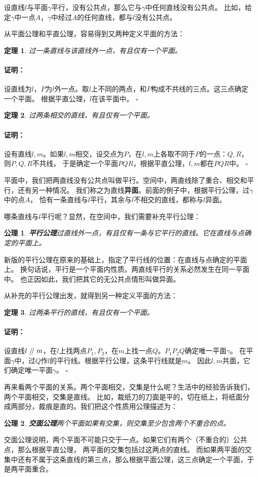 \documentclass[12pt,UTF8]{ctexbook}
\newtheorem{tm}{定理}[section]
\newtheorem{po}{公理}
\renewcommand\parallel{\mathrel{/\mskip-4mu/}}
\newenvironment{proof2}{\paragraph{\textbf{证明：}}}{\hfill$\square$}
\begin{document}
设直线$l$与平面$\gamma$平行，没有公共点，那么它与$\gamma$中任何直线没有公共点。
比如，给定$\gamma$中一点$A$，$\gamma$中经过$A$的任何直线，都与$l$没有公共点。

从平面公理和平直公理，容易得到又两种定义平面的方法：
\begin{tm}
    过一条直线与该直线外一点，有且仅有一个平面。
\end{tm}
\begin{proof2}
    设直线为$l$，$P$为$l$外一点。取$l$上不同的两点，和$P$构成不共线的三点。这三点确定一个平面。
    根据平直公理，$l$在该平面中。
\end{proof2}
\begin{tm}
    过两条相交的直线，有且仅有一个平面。
\end{tm}
\begin{proof2}
    设有直线$l,m$。如果$l,m$相交，设交点为$P$，在$l,m$上各取不同于$P$的一点：$Q,R$，则$P,Q,R$不共线，
    于是确定一个平面$PQR$，根据平直公理，$l,m$都在$PQR$中。
\end{proof2}

平面中，我们把两直线没有公共点叫做平行。空间中，两直线除了重合、相交和平行，还有另一种情况。
我们称之为直线\textbf{异面}。前面的例子中，根据平行公理，过$\gamma$中的点$A$，
恰有一条直线与$l$平行，其余与$l$不相交的直线，都称与$l$异面。

哪条直线与$l$平行呢？显然，在空间中，我们需要补充平行公理：
\begin{po}{\textbf{平行公理}}\label{po:2}
    过直线外一点，有且仅有一条与它平行的直线。它在直线与点确定的平面上。
\end{po}
新版的平行公理在原来的基础上，指定了平行线的位置：在直线与点确定的平面上。
换句话说，平行是一个平面内性质。两直线平行的关系必然发生在同一平面中。
也正因如此，我们把其它的无公共点情形叫做异面。

从补充的平行公理出发，就得到另一种定义平面的方法：
\begin{tm}
    过两条平行的直线，有且仅有一个平面。
\end{tm}
\begin{proof2}
    设直线$l \parallel m$，在$l$上找两点$P_1,P_2$，在$m$上找一点$Q$。$P_1P_2Q$确定唯一平面$\gamma$。
    在平面$\gamma$中，过$Q$作$l$的平行线。根据平行公理，这条平行线就是$m$。
    因此$l,m$共面，它们确定唯一平面$\gamma$。
\end{proof2}

再来看两个平面的关系。两个平面相交，交集是什么呢？生活中的经验告诉我们，两个平面相交，交集是直线。
比如，裁纸刀的刀面是平的，切在纸上，将纸面分成两部分，裁痕是直的。我们把这个性质用公理描述为：
\begin{po}{\textbf{交面公理}}\label{po:3}
    两个平面如果有交集，则交集至少包含两个不重合的点。
\end{po}
交面公理说明，两个平面不可能只交于一点。如果它们有两个（不重合的）公共点，那么根据平直公理，
两平面的交集包括过这两点的直线。
而如果两平面的交集中还有不属于这条直线的第三点，那么根据平面公理，这三点确定一个平面，于是两平面重合。
\end{document}
